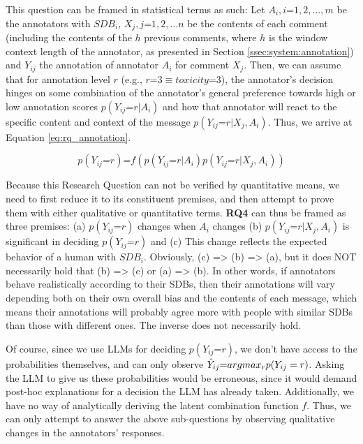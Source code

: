 This question can be framed in statistical terms as such: Let $A_i, i\text{=}1,2,\dots ,m$ be the annotators with $SDB_i$, $X_j, j\text{=}1,2,\dots n$ be the contents of each comment (including the contents of the $h$ previous comments, where $h$ is the window context length of the annotator, as presented in Section \ref{ssec:system:annotation}) and $Y_{ij}$ the annotation of annotator $A_i$ for comment $X_j$.
Then, we can assume that for annotation level $r$ (e.g., $r \text{=} 3 \equiv toxicity\text{=}3$), the annotator's decision hinges on some combination of the annotator's general preference towards high or low annotation scores $p(Y_{ij} \text{=} r | A_i)$ and how that annotator will react to the specific content and context of the message $p(Y_{ij} \text{=} r | X_j, A_i)$. Thus, we arrive at Equation \ref{eq:rq_annotation}.

\begin{equation}
	\label{eq:rq_annotation}
	p(Y_{ij} \text{=} r) \text{=} f(p(Y_{ij} \text{=} r | A_i) p(Y_{ij} \text{=} r | X_j, A_i)) 
\end{equation}


Because this Research Question can not be verified by quantitative means, we need to first reduce it to its constituent premises, and then attempt to prove them with either qualitative or quantitative terms. \textbf{RQ4} can thus be framed as three premises: (a) $p(Y_{ij} \text{=} r)$ changes when $A_i$ changes (b) $p(Y_{ij} \text{=} r | X_j, A_i)$ is significant in deciding $p(Y_{ij} \text{=} r)$ and (c) This change reflects the expected behavior of a human with $SDB_i$. Obviously, (c) => (b) => (a), but it does NOT necessarily hold that (b) => (c) or (a) => (b). In other words, if annotators behave realistically according to their \acp{SDB}, then their annotations will vary depending both on their own overall bias and the contents of each message, which means their annotations will probably agree more with people with similar \acp{SDB} than those with different ones. The inverse does not necessarily hold.

\def\hat{\mathaccent "705E\relax}

Of course, since we use LLMs for deciding $p(Y_{ij} \text{=} r)$, we don't have access to the probabilities themselves, and can only observe $\hat{Y}_{ij} \text{=} argmax_{r}p(Y_{ij} = r)$. Asking the LLM to give us these probabilities would be erroneous, since it would demand post-hoc explanations for a decision the LLM has already taken. Additionally, we have no way of analytically deriving the latent combination function $f$. Thus, we can only attempt to answer the above sub-questions by observing qualitative changes in the annotators' responses.

